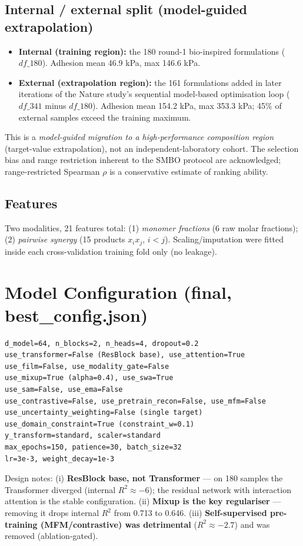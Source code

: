 \documentclass[utf8]{frontiers_suppmat}
\begin{document}
\subsection{Internal / external split (model-guided extrapolation)}
\begin{itemize}
\item \textbf{Internal (training region):} the 180 round-1 bio-inspired
  formulations ($df\_180$). Adhesion mean 46.9 kPa, max 146.6 kPa.
\item \textbf{External (extrapolation region):} the 161 formulations added
  in later iterations of the Nature study's sequential model-based
  optimisation loop ($df\_341$ minus $df\_180$). Adhesion mean 154.2 kPa,
  max 353.3 kPa; 45\% of external samples exceed the training maximum.
\end{itemize}
This is a \emph{model-guided migration to a high-performance composition
region} (target-value extrapolation), not an independent-laboratory cohort.
The selection bias and range restriction inherent to the SMBO protocol are
acknowledged; range-restricted Spearman $\rho$ is a conservative estimate of
ranking ability.

\subsection{Features}
Two modalities, 21 features total: (1) \emph{monomer fractions} (6 raw molar
fractions); (2) \emph{pairwise synergy} (15 products $x_i x_j$, $i<j$).
Scaling/imputation were fitted inside each cross-validation training fold
only (no leakage).

\section{Model Configuration (final, best\_config.json)}

\begin{verbatim}
d_model=64, n_blocks=2, n_heads=4, dropout=0.2
use_transformer=False (ResBlock base), use_attention=True
use_film=False, use_modality_gate=False
use_mixup=True (alpha=0.4), use_swa=True
use_sam=False, use_ema=False
use_contrastive=False, use_pretrain_recon=False, use_mfm=False
use_uncertainty_weighting=False (single target)
use_domain_constraint=True (constraint_w=0.1)
y_transform=standard, scaler=standard
max_epochs=150, patience=30, batch_size=32
lr=3e-3, weight_decay=1e-3
\end{verbatim}

Design notes: (i) \textbf{ResBlock base, not Transformer} --- on 180 samples
the Transformer diverged (internal $R^2 \approx -6$); the residual network
with interaction attention is the stable configuration. (ii) \textbf{Mixup
is the key regulariser} --- removing it drops internal $R^2$ from 0.713 to
0.646. (iii) \textbf{Self-supervised pre-training (MFM/contrastive) was
detrimental} ($R^2 \approx -2.7$) and was removed (ablation-gated).
\end{document}
